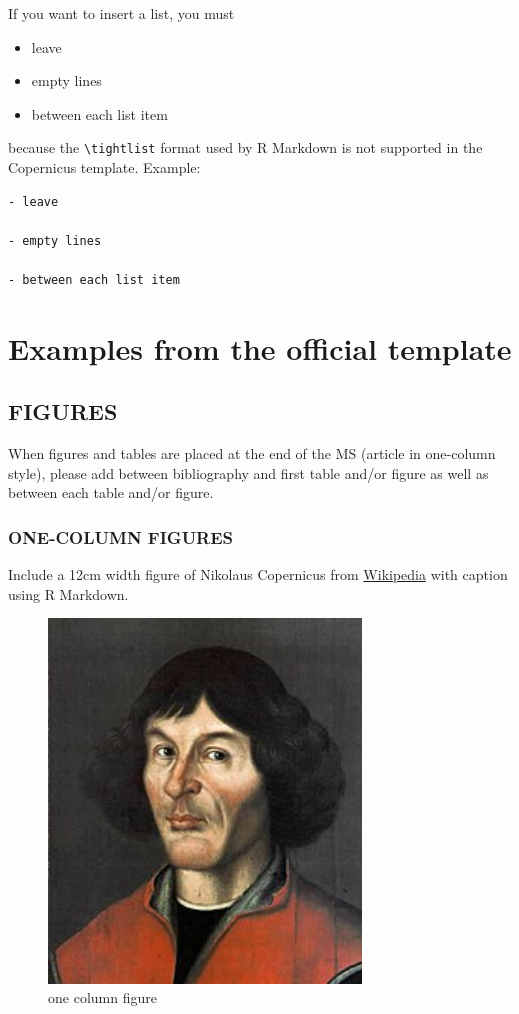 \documentclass[gc, manuscript]{copernicus}
\begin{document}
If you want to insert a list, you must

\begin{itemize}
\item
  leave
\item
  empty lines
\item
  between each list item
\end{itemize}

because the \texttt{\textbackslash{}tightlist} format used by R Markdown
is not supported in the Copernicus template. Example:

\begin{verbatim}
- leave

- empty lines

- between each list item
\end{verbatim}

\section{Examples from the official template}

\subsection{FIGURES}

When figures and tables are placed at the end of the MS (article in
one-column style), please add \clearpage between bibliography and first
table and/or figure as well as between each table and/or figure.

\subsubsection{ONE-COLUMN FIGURES}

Include a 12cm width figure of Nikolaus Copernicus from
\href{https://en.wikipedia.org/wiki/File:Nikolaus_Kopernikus.jpg}{Wikipedia}
with caption using R Markdown.

\begin{figure}
\includegraphics[width=8.3cm]{Nikolaus_Kopernikus} \caption{one column figure}\label{fig:unnamed-chunk-11}
\end{figure}
\end{document}
